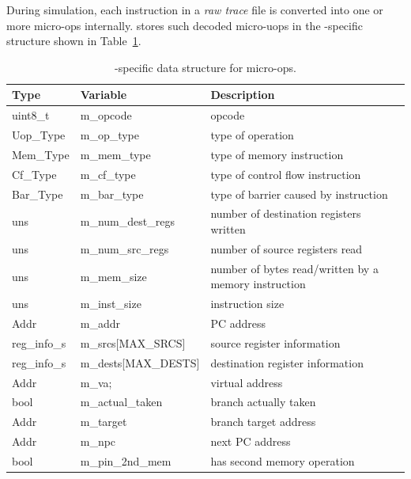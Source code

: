 During simulation, each instruction in a \emph{raw trace} file is
converted into one or more micro-ops internally. \SIM stores such
decoded micro-uops in the \SIM-specific structure shown in
Table~\ref{table:trace_uops}.

\begin{table}[!htb]
\begin{footnotesize}
\begin{center}
\caption{\SIM-specific data structure for micro-ops.}
\label{table:trace_uops}
\begin{tabular}{|l|l|l|} 
\hline
Type      & Variable                 & Description \\ \hline \hline
uint8\_t  & m\_opcode                & opcode \\ \hline
Uop\_Type & m\_op\_type              & type of operation \\ \hline
Mem\_Type & m\_mem\_type             & type of memory instruction \\ \hline
Cf\_Type  & m\_cf\_type              & type of control flow instruction \\ \hline
Bar\_Type & m\_bar\_type             & type of barrier caused by instruction \\ \hline
uns       &   m\_num\_dest\_regs     & number of destination registers written \\ \hline
uns       &   m\_num\_src\_regs      & number of source registers read \\ \hline
uns       &   m\_mem\_size           & number of bytes read/written by a memory instruction \\ \hline
uns       &   m\_inst\_size          & instruction size \\ \hline
Addr      &   m\_addr                & PC address  \\ \hline
reg\_info\_s&   m\_srcs[MAX\_SRCS]   & source register information \\ \hline
reg\_info\_s&   m\_dests[MAX\_DESTS] & destination register information \\ \hline
Addr      &   m\_va;                 & virtual address \\ \hline
bool      &   m\_actual\_taken       & branch actually taken \\ \hline
Addr      &   m\_target              & branch target address \\ \hline
Addr      &   m\_npc                 & next PC address  \\ \hline
bool      &   m\_pin\_2nd\_mem       & has second memory operation \\ \hline

\end{tabular}
\end{center}
\end{footnotesize}
\end{table}
